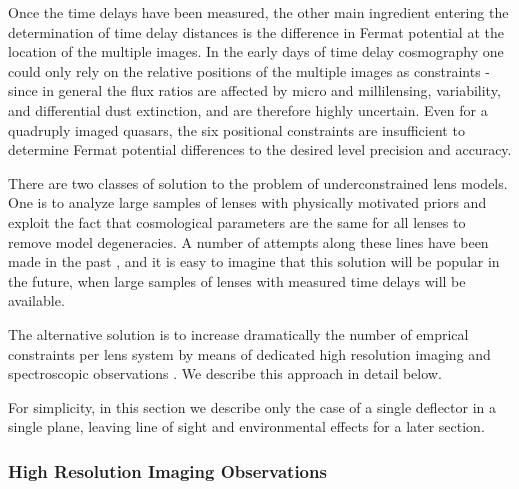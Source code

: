 Once the time delays have been measured, the other main ingredient
entering the determination of time delay distances is the difference
in Fermat potential at the location of the multiple images. In the
early days of time delay cosmography one could only rely on the
relative positions of the multiple images as constraints - since in
general the flux ratios are affected by micro and millilensing,
variability, and differential dust extinction, and are therefore
highly uncertain. Even for a quadruply imaged quasars, the six
positional constraints are insufficient to determine Fermat potential
differences to the desired level precision and accuracy.

There are two classes of solution to the problem of underconstrained
lens models. One is to analyze large samples of lenses with physically
motivated priors and exploit the fact that cosmological parameters are
the same for all lenses to remove model degeneracies. A number of
attempts along these lines have been made in the past \cite{Ogu07},
and it is easy to imagine that this solution will be popular in the
future, when large samples of lenses with measured time delays will be
available.

The alternative solution is to increase dramatically the number of
emprical constraints per lens system by means of dedicated high
resolution imaging and spectroscopic observations
\cite{Suy++10,Suy++13,Suy++14}. We describe this approach in detail
below.

For simplicity, in this section we describe only the case of a single
deflector in a single plane, leaving line of sight and environmental
effects for a later section.


\subsubsection{High Resolution Imaging Observations}

